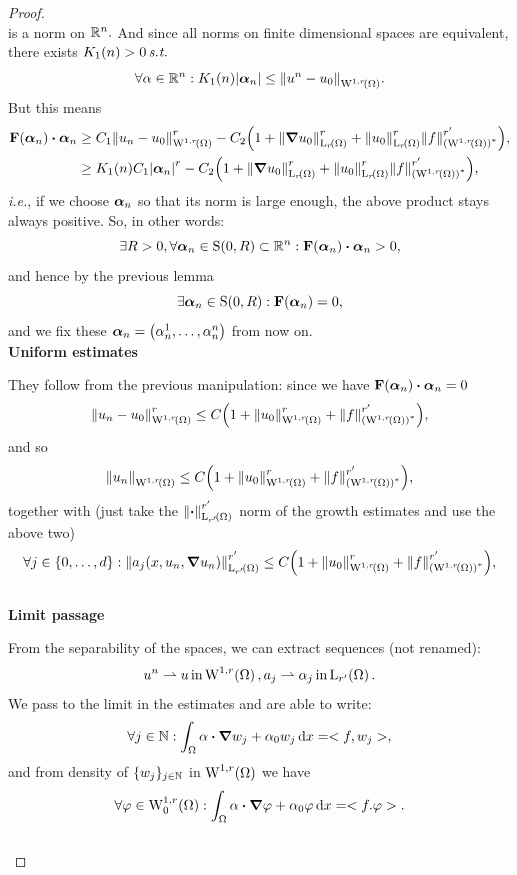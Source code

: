 \documentclass{article}
\begin{document}
\begin{proof}
\[	\]
	is a norm on ${\mathbb R}^{n}.$ And since all norms on finite dimensional spaces are equivalent, there exists $K_1(n) > 0 \, \text{\textit{s.t.}} \,$
	\[
		\forall \alpha \in \R^n: K_1(n) |\vb*{\alpha}_n| \leq \norm{u^n-u_0}_{\WkpSet[1][r]{\Omega}}.
	\]
	But this means
\begin{align*}
	\vb{F}\qty(\vb*{\alpha}_n) \vdot \vb*{\alpha}_n  &\geq C_1 \norm{u_n - u_0}_{\WkpSet[1][r]{\Omega}}^r - C_2\qty(1 + \norm{\grad u_0}_{\LpSet[r]{\Omega}}^r + \norm{u_0}_{\LpSet[r]{\Omega}}^r \norm{f}_{\qty(\WkpSet[1][r]{\Omega})^{*}}^{r'}),\\
							 &\geq K_1(n) C_1 \abs{\vb*{\alpha}_n}^r- C_2\qty(1 + \norm{\grad u_0}_{\LpSet[r]{\Omega}}^r + \norm{u_0}_{\LpSet[r]{\Omega}}^r \norm{f}_{\qty(\WkpSet[1][r]{\Omega})^{*}}^{r'}),
\end{align*}
\textit{i.e.}, if we choose $\vb*{\alpha}_n$ so that its norm is large enough, the above product stays always positive. So, in other words:
	\[
		\exists R>0, \forall \vb*{\alpha}_n \in \text{S}(0,R) \subset \R^n: \vb{F}\qty(\vb*{\alpha}_n) \vdot \vb*{\alpha}_n >0,
	\]
	and hence by the previous lemma
	\[
		\exists \vb*{\alpha}_n \in \text{S}(0,R): \vb{F}\qty(\vb*{\alpha}_n) = 0,
	\]
	and we fix these $\vb*{\alpha}_n = \qty(\alpha^1_n, \dots, \alpha_n^n)$ from now on. \\

	\textbf{Uniform estimates}


	They follow from the previous manipulation: since we have $\vb{F}\qty(\vb*{\alpha}_n) \vdot \vb*{\alpha}_n = 0$
	\[
		\norm{u_n-u_0}_{\WkpSet[1][r]{\Omega}}^r\leq C\qty(1+\norm{u_0}_{\WkpSet[1][r]{\Omega}}^r+ \norm{f}^{r'}_{\qty(\WkpSet[1][r]{\Omega})^{*}}),
	\]
	and so
	\[
		\norm{u_n}_{\WkpSet[1][r]{\Omega}} \leq C\qty(1+\norm{u_0}_{\WkpSet[1][r]{\Omega}}^r+ \norm{f}^{r'}_{\qty(\WkpSet[1][r]{\Omega})^{*}}),
	\]
	together with (just take the $\norm{\vdot}_{\LpSet[r']{\Omega}}^{r'}$ norm of the growth estimates and use the above two)
	\[
		\forall j \in \{0,\dots,d\}: \norm{a_j\qty(x, u_n, \grad u_n)}_{\LpSet[r']{\Omega}}^{r'} \leq C\qty(1+\norm{u_0}_{\WkpSet[1][r]{\Omega}}^r+ \norm{f}^{r'}_{\qty(\WkpSet[1][r]{\Omega})^{*}}),
	\] 
	\\

	\textbf{Limit passage}


	From the separability of the spaces, we can extract sequences (not renamed):
	\[
		u^n \rightharpoonup u \, \text{in} \, \WkpSet[1][r]{\Omega}, a_j \rightharpoonup \alpha_j \, \text{in} \, \LpSet[r']{\Omega}.
	\]
	We pass to the limit in the estimates and are able to write:
	\[
		\forall j \in \N: \int_{\Omega}\alpha \vdot \grad w_j + \alpha_0 w_j\dd{x} = <f,w_j>,
	\]
	and from density of $\{w_j\}_{j \in {\mathbb N}}$ in $\WkpSet[1][r]{\Omega}$ we have
	\[
		\forall \varphi \in \WkpzeroSet[1][r]{\Omega}: \int_{\Omega}\alpha \vdot \grad \varphi + \alpha_0 \varphi\dd{x} = <f. \varphi>.
	\]
	\\


\end{proof}
\end{document}
